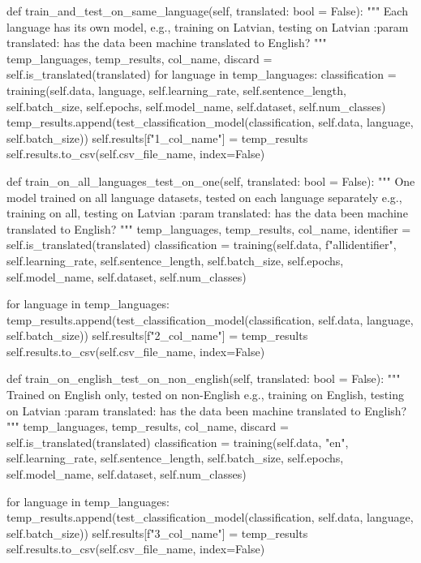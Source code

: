\begin{python}
    def train_and_test_on_same_language(self, translated: bool = False):
        """ Each language has its own model, e.g., training on Latvian, testing on Latvian
        :param translated: has the data been machine translated to English?
        """
        temp_languages, temp_results, col_name, discard = self.is_translated(translated)
        for language in temp_languages:
            classification = training(self.data, language, self.learning_rate, self.sentence_length, self.batch_size,
                                      self.epochs, self.model_name, self.dataset, self.num_classes)
            temp_results.append(test_classification_model(classification, self.data, language, self.batch_size))
        self.results[f"1_{col_name}"] = temp_results
        self.results.to_csv(self.csv_file_name, index=False)

    def train_on_all_languages_test_on_one(self, translated: bool = False):
        """ One model trained on all language datasets, tested on each language separately
        e.g., training on all, testing on Latvian
        :param translated: has the data been machine translated to English?
        """
        temp_languages, temp_results, col_name, identifier = self.is_translated(translated)
        classification = training(self.data, f"all{identifier}", self.learning_rate, self.sentence_length,
                                  self.batch_size, self.epochs, self.model_name, self.dataset, self.num_classes)

        for language in temp_languages:
            temp_results.append(test_classification_model(classification, self.data, language, self.batch_size))
        self.results[f"2_{col_name}"] = temp_results
        self.results.to_csv(self.csv_file_name, index=False)

    def train_on_english_test_on_non_english(self, translated: bool = False):
        """ Trained on English only, tested on non-English
        e.g., training on English, testing on Latvian
        :param translated: has the data been machine translated to English?
        """
        temp_languages, temp_results, col_name, discard = self.is_translated(translated)
        classification = training(self.data, "en", self.learning_rate, self.sentence_length,
                                  self.batch_size, self.epochs, self.model_name, self.dataset, self.num_classes)

        for language in temp_languages:
            temp_results.append(test_classification_model(classification, self.data, language, self.batch_size))
        self.results[f"3_{col_name}"] = temp_results
        self.results.to_csv(self.csv_file_name, index=False)


\end{python}
